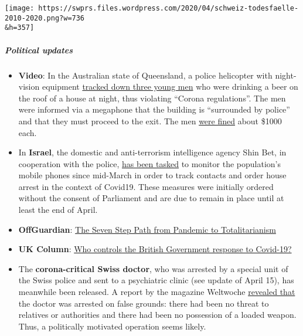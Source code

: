 \texttt{[image: https://swprs.files.wordpress.com/2020/04/schweiz-todesfaelle-2010-2020.png?w=736\\\&h=357]}

\hypertarget{political-updates}{%
\subparagraph{\texorpdfstring{\textbf{Political
updates}}{Political updates}}\label{political-updates}}

\begin{itemize}
\tightlist
\item
  \textbf{Video}: In the Australian state of Queensland, a police
  helicopter with night-vision equipment
  \href{https://twitter.com/Independent/status/1252911273597120513}{tracked
  down three young men} who were drinking a beer on the roof of a house
  at night, thus violating ``Corona regulations''. The men were informed
  via a megaphone that the building is ``surrounded by police'' and that
  they must proceed to the exit. The men
  \href{https://www.dailystar.co.uk/news/world-news/police-helicopter-uses-night-vision-21899640}{were
  fined} about \$1000 each.
\item
  In \textbf{Israel}, the domestic and anti-terrorism intelligence
  agency Shin Bet, in cooperation with the police,
  \href{https://www.jewishpress.com/news/the-courts/state-to-high-court-even-more-shin-bet-involvement-in-fighting-the-coronavirus/2020/04/14/}{has
  been tasked} to monitor the population's mobile phones since mid-March
  in order to track contacts and order house arrest in the context of
  Covid19. These measures were initially ordered without the consent of
  Parliament and are due to remain in place until at least the end of
  April.
\item
  \textbf{OffGuardian}:
  \href{https://off-guardian.org/2020/04/23/the-seven-step-path-from-pandemic-to-totalitarianism/}{The
  Seven Step Path from Pandemic to Totalitarianism}
\item
  \textbf{UK Column}:
  \href{https://www.ukcolumn.org/article/who-controls-british-government-response-covid19-part-one}{Who
  controls the British Government response to Covid-19?}
\item
  The \textbf{corona-critical Swiss doctor}, who was arrested by a
  special unit of the Swiss police and sent to a psychiatric clinic (see
  update of April 15), has meanwhile been released. A report by the
  magazine Weltwoche
  \href{https://uncut-news.ch/wp-content/uploads/2020/04/Wer-l\%C3\%B6ste-den-Fehlalarm-aus.pdf}{revealed
  that} the doctor was arrested on false grounds: there had been no
  threat to relatives or authorities and there had been no possession of
  a loaded weapon. Thus, a politically motivated operation seems likely.

\end{itemize}
